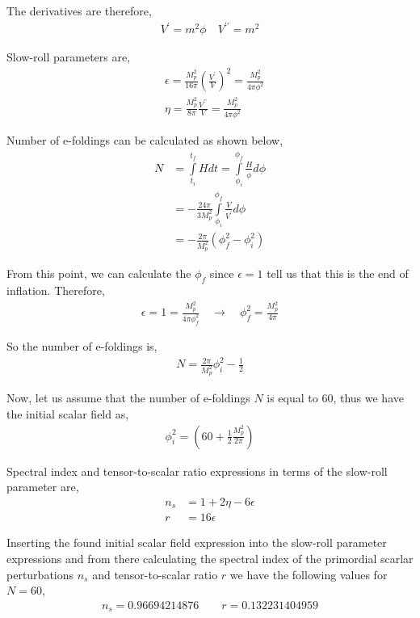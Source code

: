 The derivatives are therefore,
\begin{align}
V^{\prime} = m^{2}\phi \quad V^{\prime\prime} = m^{2}
\end{align}

Slow-roll parameters are,
\begin{align}
&\epsilon = \frac{M_{p}^{2}}{16\pi}\left(\frac{V^{\prime}}{V}\right)^{2} = \frac{M_{p}^{2}}{4\pi \phi^{2}}\\
&\eta = \frac{M_{p}^{2}}{8\pi}\frac{V^{\prime\prime}}{V} = \frac{M_{p}^{2}}{4\pi\phi^{2}}
\end{align}

Number of e-foldings can be calculated as shown below,
\begin{align}
N &= \int\limits_{t_{i}}^{t_{f}}Hdt = \int\limits_{\phi_{i}}^{\phi_{f}}\frac{H}{\dot{\phi}}d\phi\\
&= -\frac{24\pi}{3M_{p}^{2}}\int\limits_{\phi_{i}}^{\phi_{f}}\frac{V}{V^{\prime}}d\phi\\
&= -\frac{2\pi}{M_{p}^{2}}\left(\phi_{f}^{2} - \phi_{i}^{2}\right)
\end{align}

From this point, we can calculate the $\phi_f$ since $\epsilon = 1$ tell us that this is the end of inflation. Therefore,
\begin{align}
\epsilon = 1 = \frac{M_{p}^{2}}{4\pi\phi_{f}^{2}}\quad\rightarrow\quad\phi_{f}^{2} = \frac{M_{p}^{2}}{4\pi}
\end{align}

So the number of e-foldings is,
\begin{align}
N = \frac{2\pi}{M_{p}^{2}}\phi_{i}^{2} - \frac{1}{2}
\end{align}

Now, let us assume that the number of e-foldings $N$ is equal to $60$, thus we have the initial scalar field as,
\begin{align}
\phi_{i}^{2} = \left(60 + \frac{1}{2}\frac{M_{p}^{2}}{2\pi}\right)
\end{align}

Spectral index and tensor-to-scalar ratio expressions in terms of the slow-roll parameter are,
\begin{align}
n_{s} &= 1 + 2\eta - 6\epsilon\\
r &= 16\epsilon
\end{align}

Inserting the found initial scalar field expression into the slow-roll parameter expressions and from there calculating the spectral index of the primordial scarlar perturbations $n_{s}$ and tensor-to-scalar ratio $r$ we have the following values for $N=60$,
\begin{align}
n_{s} = 0.96694214876\quad\quad r = 0.132231404959
\end{align}

